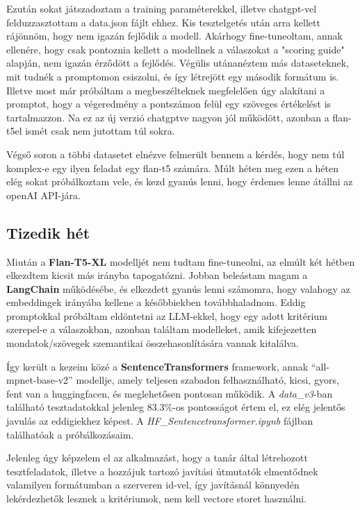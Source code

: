 \documentclass{article}
\begin{document}
Ezután sokat játszadoztam a training paraméterekkel, illetve chatgpt-vel felduzzasztottam a data.json fájlt ehhez.
Kis tesztelgetés után arra kellett rájönnöm, hogy nem igazán fejlődik a modell. Akárhogy fine-tuneoltam, annak ellenére, hogy csak
pontoznia kellett a modellnek a válaszokat a "scoring guide" alapján, nem igazán érződött a fejlődés.
Végülis utánanéztem más dataseteknek, mit tudnék a promptomon csiszolni, és így létrejött egy második formátum is. 
Illetve most már próbáltam a megbeszélteknek megfelelően úgy alakítani a promptot, hogy a végeredmény a pontszámon felül egy szöveges értékelést is tartalmazzon.
Na ez az új verzió chatgptve nagyon jól működött, azonban a flan-t5el ismét csak nem jutottam túl sokra.

Végső soron a többi datasetet elnézve felmerült bennem a kérdés, hogy nem túl komplex-e egy ilyen feladat egy flan-t5 számára.
Múlt héten meg ezen a héten elég sokat próbálkoztam vele, és kezd gyanús lenni, hogy érdemes lenne átállni az openAI API-jára.

\subsection{Tizedik hét}

Miután a \textbf{Flan-T5-XL} modelljét nem tudtam fine-tuneolni, az elmúlt két hétben elkezdtem kicsit más irányba tapogatózni.
Jobban beleástam magam a \textbf{LangChain} működésébe, és elkezdett gyanús lenni számomra, hogy valahogy az embeddingek irányába kellene  a későbbiekben továbbhaladnom. Eddig promptokkal próbáltam eldöntetni az LLM-ekkel, hogy egy adott kritérium szerepel-e a válaszokban, azonban találtam modelleket, amik kifejezetten mondatok/szövegek szemantikai összehasonlítására vannak kitalálva.

Így került a kezeim közé a \textbf{SentenceTransformers} framework, annak ``all-mpnet-base-v2'' modellje, amely teljesen szabadon felhasználható, kicsi, gyors, fent van a huggingfacen, és meglehetősen pontosan működik. A \textit{data\_v3}-ban található tesztadatokkal jelenleg 83.3\%-os pontosságot értem el, ez elég jelentős javulás az eddigiekhez képest. A \textit{HF\_Sentencetransformer.ipynb} fájlban találhatóak a próbálkozásaim.

Jelenleg úgy képzelem el az alkalmazást, hogy a tanár által létrehozott tesztfeladatok, illetve a hozzájuk tartozó javítási útmutatók 
elmentődnek valamilyen formátumban a szerveren id-vel, így javításnál könnyedén lekérdezhetők lesznek a kritériumok, nem kell vectore storet használni.
\end{document}
